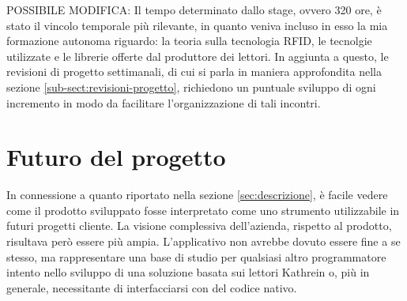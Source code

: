 POSSIBILE MODIFICA: Il tempo determinato dallo stage, ovvero 320 ore, è stato il vincolo temporale più rilevante, in quanto veniva incluso in esso la mia
formazione autonoma riguardo: la teoria sulla tecnologia RFID, le tecnolgie utilizzate e le librerie offerte dal produttore dei lettori.
In aggiunta a questo, le revisioni di progetto settimanali, di cui si parla in maniera approfondita nella sezione \ref{sub-sect:revisioni-progetto},
richiedono un puntuale sviluppo di ogni incremento in modo da facilitare l'organizzazione di tali incontri.
\section{Futuro del progetto}
In connessione a quanto riportato nella sezione \ref{sec:descrizione}, è facile vedere come il prodotto sviluppato fosse interpretato come uno strumento utilizzabile
in futuri progetti cliente. La visione complessiva dell'azienda, rispetto al prodotto, risultava però essere più ampia. 
L'applicativo non avrebbe dovuto essere fine a se stesso, ma rappresentare una base di studio per qualsiasi altro programmatore intento nello sviluppo 
di una soluzione basata sui lettori Kathrein o, più in generale, necessitante di interfacciarsi con del codice nativo.

